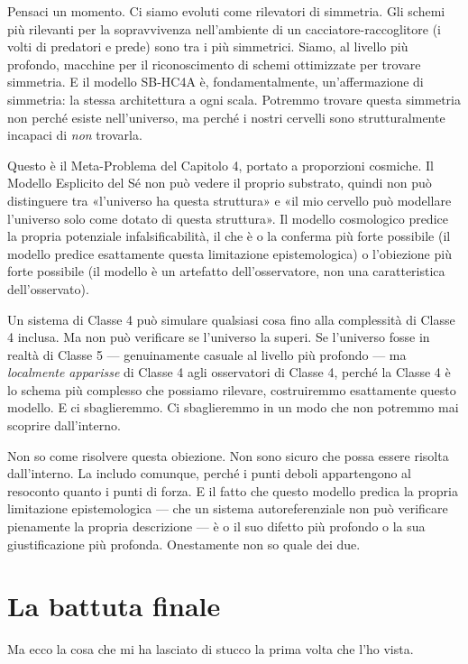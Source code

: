 \documentclass[11pt, twoside, openright]{book}
\begin{document}
Pensaci un momento. Ci siamo evoluti come rilevatori di simmetria. Gli schemi più rilevanti per la sopravvivenza nell'ambiente di un cacciatore-raccoglitore (i volti di predatori e prede) sono tra i più simmetrici. Siamo, al livello più profondo, macchine per il riconoscimento di schemi ottimizzate per trovare simmetria. E il modello SB-HC4A è, fondamentalmente, un'affermazione di simmetria: la stessa architettura a ogni scala. Potremmo trovare questa simmetria non perché esiste nell'universo, ma perché i nostri cervelli sono strutturalmente incapaci di \textit{non} trovarla.

Questo è il Meta-Problema del Capitolo 4, portato a proporzioni cosmiche. Il Modello Esplicito del Sé non può vedere il proprio substrato, quindi non può distinguere tra «l'universo ha questa struttura» e «il mio cervello può modellare l'universo solo come dotato di questa struttura». Il modello cosmologico predice la propria potenziale infalsificabilità, il che è o la conferma più forte possibile (il modello predice esattamente questa limitazione epistemologica) o l'obiezione più forte possibile (il modello è un artefatto dell'osservatore, non una caratteristica dell'osservato).

Un sistema di Classe 4 può simulare qualsiasi cosa fino alla complessità di Classe 4 inclusa. Ma non può verificare se l'universo la superi. Se l'universo fosse in realtà di Classe 5 --- genuinamente casuale al livello più profondo --- ma \textit{localmente apparisse} di Classe 4 agli osservatori di Classe 4, perché la Classe 4 è lo schema più complesso che possiamo rilevare, costruiremmo esattamente questo modello. E ci sbaglieremmo. Ci sbaglieremmo in un modo che non potremmo mai scoprire dall'interno.

Non so come risolvere questa obiezione. Non sono sicuro che possa essere risolta dall'interno. La includo comunque, perché i punti deboli appartengono al resoconto quanto i punti di forza. E il fatto che questo modello predica la propria limitazione epistemologica --- che un sistema autoreferenziale non può verificare pienamente la propria descrizione --- è o il suo difetto più profondo o la sua giustificazione più profonda. Onestamente non so quale dei due.


\section*{La battuta finale}

Ma ecco la cosa che mi ha lasciato di stucco la prima volta che l'ho vista.
\end{document}
